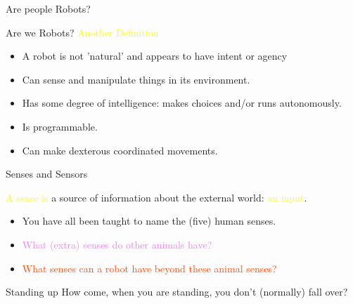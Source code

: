 \documentclass[color=pdftex,usenames,dvipsnames, aspectratio=169]{beamer}
\begin{document}
\begin{frame}[label=peopleQuest]{Are people Robots?}
\begin{block}{Are we Robots? \textcolor{yellow}{Another Definition}}
    \begin{itemize}
     \item A robot is \alert{not 'natural'} and appears to have \alert{intent} or agency
     \item Can \alert{sense} and \alert{manipulate things} in its environment.
     \item Has some \alert{degree of intelligence}: makes choices and/or \alert{runs autonomously}.
     \item Is \alert{programmable}.
     \item Can make \alert{dexterous coordinated movements}.
    \end{itemize}
\end{block}

\end{frame}

\begin{frame}{Senses and Sensors}

\begin{block}{\textcolor{yellow}{A sense is} a source of information about the external world: \textcolor{yellow}{an input}.}

\begin{itemize}
\item \textcolor{OliveGreen}{You have all been taught to name the (five) human senses.}
\item \textcolor{violet}{What (extra) senses do other animals have?}
\item \textcolor{OrangeRed}{What senses can a robot have beyond these animal senses?}
\end{itemize}
\end{block}

\begin{alertblock}{Standing up}
How come, when you are standing, you don't (normally) fall over?

\end{alertblock}

\end{frame}
\end{document}
